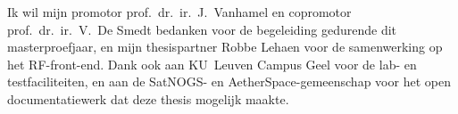 
Ik wil mijn promotor prof.\ dr.\ ir.\ J.\ Vanhamel en copromotor prof.\ dr.\ ir.\ V.\ De Smedt bedanken voor de begeleiding gedurende dit masterproefjaar, en mijn thesispartner Robbe Lehaen voor de samenwerking op het RF-front-end. Dank ook aan KU~Leuven Campus Geel voor de lab- en testfaciliteiten, en aan de SatNOGS- en AetherSpace-gemeenschap voor het open documentatiewerk dat deze thesis mogelijk maakte.
